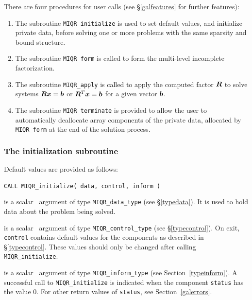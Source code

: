 \documentclass{galahad}
\newcommand{\packagename}{MIQR}
\begin{document}

\galarguments
There are four procedures for user calls
(see \S\ref{galfeatures} for further features): 

\begin{enumerate}
\item The subroutine 
      {\tt \packagename\_initialize} 
      is used to set default values, and initialize private data, 
      before solving one or more problems with the
      same sparsity and bound structure.
\item The subroutine 
      {\tt \packagename\_form} 
      is called to form the  multi-level incomplete factorization.
\item The subroutine 
      {\tt \packagename\_apply} 
      is called to apply the computed factor ${\bm{R}}$ to solve systems 
      ${\bm{R}} {\bm{x}} = {\bm{b}}$ or ${\bm{R}}^T {\bm{x}} = {\bm{b}}$ 
      for a given vector ${\bm{b}}$.
\item The subroutine 
      {\tt \packagename\_terminate} 
      is provided to allow the user to automatically deallocate array 
       components of the private data, allocated by 
       {\tt \packagename\_form} 
       at the end of the solution process. 
\end{enumerate}


\subsubsection{The initialization subroutine}\label{subinit}
 Default values are provided as follows:
\vspace*{1mm}

\hspace{8mm}
{\tt CALL \packagename\_initialize( data, control, inform )}

\vspace*{-3mm}
\begin{description}

 is a scalar \intentinout\ argument of type 
{\tt \packagename\_data\_type}
(see \S\ref{typedata}). It is used to hold data about the problem being 
solved. 

 is a scalar \intentout\ argument of type 
{\tt \packagename\_control\_type}
(see \S\ref{typecontrol}). 
On exit, {\tt control} contains default values for the components as
described in \S\ref{typecontrol}.
These values should only be changed after calling 
{\tt \packagename\_initialize}.

 is a scalar \intentout\ argument of type 
{\tt \packagename\_inform\_type}
(see Section~\ref{typeinform}). A successful call to
{\tt \packagename\_initialize}
is indicated when the  component {\tt status} has the value 0. 
For other return values of {\tt status}, see Section~\ref{galerrors}.

\end{description}
\end{document}
